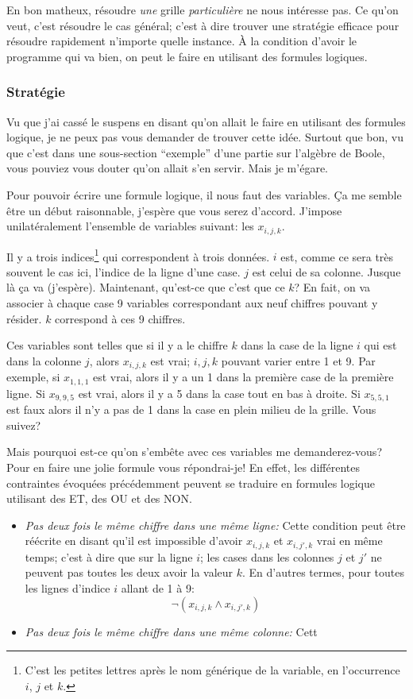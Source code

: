 En bon matheux, résoudre \emph{une} grille \emph{particulière} ne nous
intéresse pas. Ce qu'on veut, c'est résoudre le cas général; c'est à
dire trouver une stratégie efficace pour résoudre rapidement n'importe
quelle instance. À la condition d'avoir le programme qui va bien, on
peut le faire en utilisant des formules logiques.


\subsubsection{Stratégie}

Vu que j'ai cassé le suspens en disant qu'on allait le faire en
utilisant des formules logique, je ne peux pas vous demander de
trouver cette idée. Surtout que bon, vu que c'est dans une
sous-section ``exemple'' d'une partie sur l'algèbre de Boole, vous
pouviez vous douter qu'on allait s'en servir. Mais je m'égare.

Pour pouvoir écrire une formule logique, il nous faut des
variables. Ça me semble être un début raisonnable, j'espère que vous
serez d'accord. J'impose unilatéralement l'ensemble de variables
suivant: les $x_{i,j,k}$.

Il y a trois indices\footnote{C'est les petites lettres après le nom
  générique de la variable, en l'occurrence $i$, $j$ et $k$.} qui
correspondent à trois données. $i$ est, comme ce sera très souvent le
cas ici, l'indice de la ligne d'une case. $j$ est celui de sa
colonne. Jusque là ça va (j'espère). Maintenant, qu'est-ce que c'est
que ce $k$? En fait, on va associer à chaque case 9 variables
correspondant aux neuf chiffres pouvant y résider. $k$ correspond à
ces 9 chiffres.

Ces variables sont telles que si il y a le chiffre $k$ dans la case de
la ligne $i$ qui est dans la colonne $j$, alors $x_{i,j,k}$ est
vrai; $i,j,k$ pouvant varier entre 1 et 9. Par exemple, si $x_{1,1,1}$
est vrai, alors il y a un 1 dans la première case de la première
ligne. Si $x_{9,9,5}$ est vrai, alors il y a 5 dans la case tout en
bas à droite. Si $x_{5,5,1}$ est faux alors il n'y a pas de 1 dans la
case en plein milieu de la grille. Vous suivez?

Mais pourquoi est-ce qu'on s'embête avec ces variables me
demanderez-vous? Pour en faire une jolie formule vous répondrai-je! En
effet, les différentes contraintes évoquées précédemment peuvent se
traduire en formules logique utilisant des ET, des OU et des NON.

\begin{itemize}
  \item \emph{Pas deux fois le même chiffre dans une même ligne:}
    Cette condition peut être réécrite en disant qu'il est impossible
    d'avoir $x_{i,j,k}$ et $x_{i,j',k}$ vrai en même temps; c'est à
    dire que sur la ligne $i$; les cases dans les colonnes $j$ et $j'$
    ne peuvent pas toutes les deux avoir la valeur $k$. En d'autres
    termes, pour toutes les lignes d'indice $i$ allant de 1 à 9:
    \begin{equation}
      \neg ( x_{i,j,k} \land x_{i,j',k})
    \end{equation}
  \item \emph{Pas deux fois le même chiffre dans une même colonne:}
    Cett
\end{itemize}
